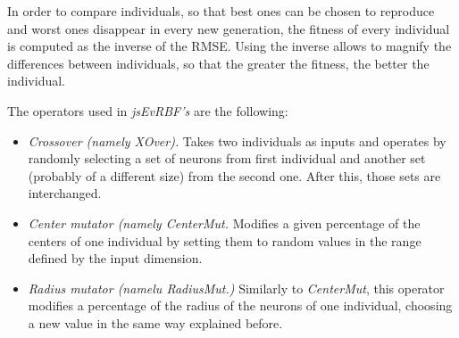 \documentclass{article}
\begin{document}
In order to compare individuals, so that best ones can be chosen to reproduce and worst ones disappear in every new generation, the fitness of every individual is computed as the inverse of the RMSE. Using the inverse allows to magnify the differences between individuals, so that the greater the fitness, the better the individual.

The operators used in {\em jsEvRBF's} are the following:

\begin{itemize}
\item {\em Crossover (namely XOver).} Takes two individuals as inputs and operates by randomly selecting a set of neurons from first individual and another set (probably of a different size) from the second one. After this, those sets are interchanged.
\item {\em Center mutator (namely CenterMut.} Modifies a given percentage of the centers of one individual by setting them to random values in the range defined by the input dimension.
\item {\em Radius mutator (namelu RadiusMut.)} Similarly to \emph{CenterMut}, this operator modifies a percentage of the radius of the neurons of one individual, choosing a new value in the same way explained before.
\end{itemize}
\end{document}
